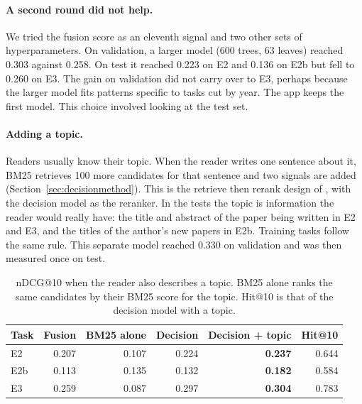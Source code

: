 \documentclass[11pt,a4paper]{article}
\begin{document}
\paragraph{A second round did not help.} We tried the fusion score as an eleventh signal and two other sets of hyperparameters. On validation, a larger model (600 trees, 63 leaves) reached 0.303 against 0.258. On test it reached 0.223 on E2 and 0.136 on E2b but fell to 0.260 on E3. The gain on validation did not carry over to E3, perhaps because the larger model fits patterns specific to tasks cut by year. The app keeps the first model. This choice involved looking at the test set.

\paragraph{Adding a topic.} Readers usually know their topic. When the reader writes one sentence about it, BM25 retrieves 100 more candidates for that sentence and two signals are added (Section~\ref{sec:decisionmethod}). This is the retrieve then rerank design of \citet{strohman2007}, with the decision model as the reranker. In the tests the topic is information the reader would really have: the title and abstract of the paper being written in E2 and E3, and the titles of the author's new papers in E2b. Training tasks follow the same rule. This separate model reached 0.330 on validation and was then measured once on test.
\begin{table}[htbp]\centering\small
\begin{tabular}{@{}lrrrrr@{}}\toprule
Task & Fusion & BM25 alone & Decision & Decision + topic & Hit@10\\\midrule
E2 & 0.207 & 0.107 & 0.224 & \textbf{0.237} & 0.644\\
E2b & 0.113 & 0.135 & 0.132 & \textbf{0.182} & 0.584\\
E3 & 0.259 & 0.087 & 0.297 & \textbf{0.304} & 0.783\\\bottomrule
\end{tabular}\caption{nDCG@10 when the reader also describes a topic. BM25 alone ranks the same candidates by their BM25 score for the topic. Hit@10 is that of the decision model with a topic.}\label{tab:topic}\end{table}
\end{document}
